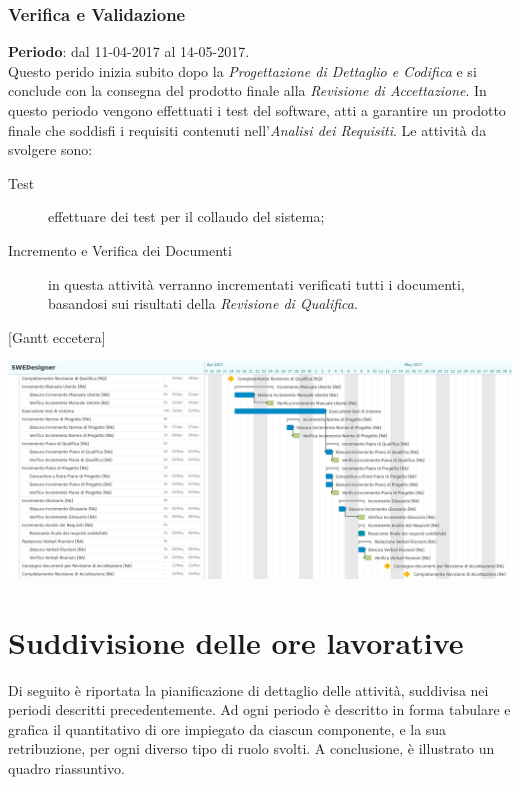 	\subsubsection{Verifica e Validazione} \label{sec:VV}

	\textbf{Periodo}: dal 11-04-2017 al 14-05-2017.
	\\ Questo perido inizia subito dopo la \emph{Progettazione di Dettaglio e Codifica} e si conclude con la consegna del prodotto finale alla \emph{Revisione di Accettazione}. In questo periodo vengono effettuati i test del software, atti a garantire un prodotto finale che soddisfi i requisiti contenuti nell'\emph{Analisi dei Requisiti}. Le attività da svolgere sono:
	\begin{description}
		\item[Test] effettuare dei test per il collaudo del sistema;
		\item[Incremento e Verifica dei Documenti] in questa attività verranno incrementati verificati tutti i documenti, basandosi sui risultati della \emph{Revisione di Qualifica}.
	\end{description}
	[Gantt eccetera]	
	
	{\includegraphics[width=15cm]{img/ganttva.png}\par}

	
\section{Suddivisione delle ore lavorative}
Di seguito è riportata la pianificazione di dettaglio delle attività, suddivisa nei periodi descritti precedentemente. Ad ogni periodo è descritto in forma tabulare e grafica il quantitativo di ore impiegato da ciascun componente, e la sua retribuzione, per ogni diverso tipo di ruolo svolti.
A conclusione, è illustrato un quadro riassuntivo.


\newcommand{\roww}[7]{
	#1 & #2 & #3 & #4 & #5 & #6 & #7
}

